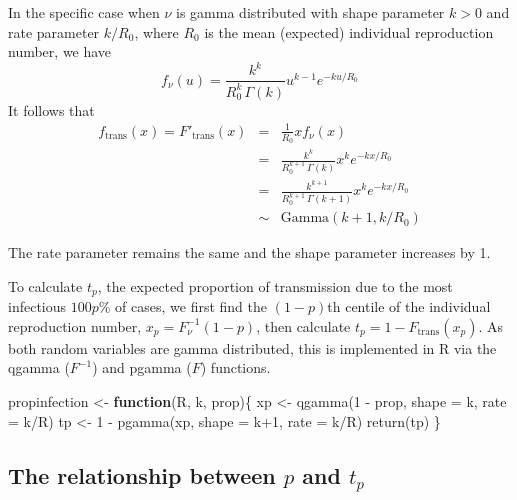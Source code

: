 \documentclass[
]{article}
\newenvironment{Shaded}{\begin{snugshade}}{\end{snugshade}}
\newcommand{\AttributeTok}[1]{\textcolor[rgb]{0.77,0.63,0.00}{#1}}
\newcommand{\ControlFlowTok}[1]{\textcolor[rgb]{0.13,0.29,0.53}{\textbf{#1}}}
\newcommand{\DecValTok}[1]{\textcolor[rgb]{0.00,0.00,0.81}{#1}}
\newcommand{\FunctionTok}[1]{\textcolor[rgb]{0.00,0.00,0.00}{#1}}
\newcommand{\NormalTok}[1]{#1}
\newcommand{\OtherTok}[1]{\textcolor[rgb]{0.56,0.35,0.01}{#1}}
\newcommand{\SpecialCharTok}[1]{\textcolor[rgb]{0.00,0.00,0.00}{#1}}
\begin{document}
In the specific case when \(\nu\) is gamma distributed with shape
parameter \(k>0\) and rate parameter \(k/R_0\), where \(R_0\) is the
mean (expected) individual reproduction number, we have
\[ f_\nu(u) = \frac{k^k}{R_0^k \, \Gamma(k)} u^{k-1} e^{-ku/R_0} \] It
follows that
\[ \begin{eqnarray*} f_\mathrm{trans}(x) =  F'_\mathrm{trans}(x) 
&=& \frac{1}{R_0} x f_\nu(x) 
\\
&=& \frac{k^k}{R_0^{k+1} \, \Gamma(k)} x^k e^{-kx/R_0} 
\\
&=& \frac{k^{k+1}}{R_0^{k+1} \, \Gamma(k+1)} x^k e^{-kx/R_0} 
\\
&\sim & \mathrm{Gamma}(k+1, k/R_0) 
\end{eqnarray*}\]

The rate parameter remains the same and the shape parameter increases by
1.

To calculate \(t_p\), the expected proportion of transmission due to the
most infectious \(100p\)\% of cases, we first find the \((1-p)\)th
centile of the individual reproduction number,
\(x_p = F^{-1}_\nu(1-p)\), then calculate
\(t_p = 1-F_\mathrm{trans}(x_p)\). As both random variables are gamma
distributed, this is implemented in R via the qgamma (\(F^{-1}\)) and
pgamma (\(F\)) functions.

\begin{Shaded}
\begin{Highlighting}[]
\NormalTok{propinfection }\OtherTok{\textless{}{-}} \ControlFlowTok{function}\NormalTok{(R, k, prop)\{}
\NormalTok{  xp }\OtherTok{\textless{}{-}} \FunctionTok{qgamma}\NormalTok{(}\DecValTok{1} \SpecialCharTok{{-}}\NormalTok{ prop, }\AttributeTok{shape =}\NormalTok{ k, }\AttributeTok{rate =}\NormalTok{ k}\SpecialCharTok{/}\NormalTok{R) }
\NormalTok{  tp }\OtherTok{\textless{}{-}} \DecValTok{1} \SpecialCharTok{{-}} \FunctionTok{pgamma}\NormalTok{(xp, }\AttributeTok{shape =}\NormalTok{ k}\SpecialCharTok{+}\DecValTok{1}\NormalTok{, }\AttributeTok{rate =}\NormalTok{ k}\SpecialCharTok{/}\NormalTok{R) }
  \FunctionTok{return}\NormalTok{(tp) }
\NormalTok{\}}
\end{Highlighting}
\end{Shaded}

\hypertarget{the-relationship-between-p-and-t_p}{%
\subsection{\texorpdfstring{The relationship between \(p\) and
\(t_p\)}{The relationship between p and t\_p}}\label{the-relationship-between-p-and-t_p}}
\end{document}
